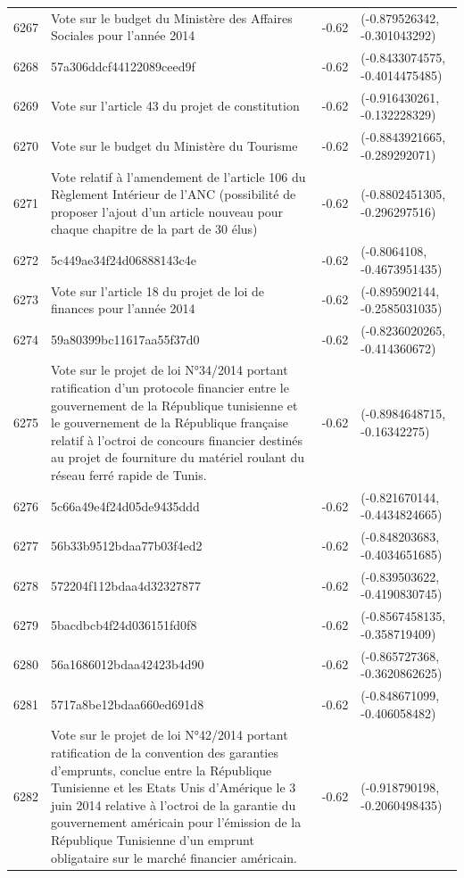 \begin{table}[ht]
\begin{tabular}{rlrl}
  6267 & Vote sur le budget du Ministère des Affaires Sociales pour l'année 2014 & -0.62 & (-0.879526342, -0.301043292) \\ 
  6268 & 57a306ddcf44122089ceed9f & -0.62 & (-0.8433074575, -0.4014475485) \\ 
  6269 & Vote sur l'article 43 du projet de constitution & -0.62 & (-0.916430261, -0.132228329) \\ 
  6270 & Vote sur le budget du Ministère du Tourisme & -0.62 & (-0.8843921665, -0.289292071) \\ 
  6271 & Vote relatif à l'amendement de l'article 106 du Règlement Intérieur de l'ANC (possibilité de proposer l'ajout d'un article nouveau pour chaque chapitre de la part de 30 élus) & -0.62 & (-0.8802451305, -0.296297516) \\ 
  6272 & 5c449ae34f24d06888143c4e & -0.62 & (-0.8064108, -0.4673951435) \\ 
  6273 & Vote sur l'article 18 du projet de loi de finances pour l'année 2014 & -0.62 & (-0.895902144, -0.2585031035) \\ 
  6274 & 59a80399bc11617aa55f37d0 & -0.62 & (-0.8236020265, -0.414360672) \\ 
  6275 & Vote sur le projet de loi N°34/2014 portant ratification d'un protocole financier entre le gouvernement de la République tunisienne et le gouvernement de la République française relatif à l'octroi de concours financier destinés au projet de fourniture du matériel roulant du réseau ferré rapide de Tunis. & -0.62 & (-0.8984648715, -0.16342275) \\ 
  6276 & 5c66a49e4f24d05de9435ddd & -0.62 & (-0.821670144, -0.4434824665) \\ 
  6277 & 56b33b9512bdaa77b03f4ed2 & -0.62 & (-0.848203683, -0.4034651685) \\ 
  6278 & 572204f112bdaa4d32327877 & -0.62 & (-0.839503622, -0.4190830745) \\ 
  6279 & 5bacdbcb4f24d036151fd0f8 & -0.62 & (-0.8567458135, -0.358719409) \\ 
  6280 & 56a1686012bdaa42423b4d90 & -0.62 & (-0.865727368, -0.3620862625) \\ 
  6281 & 5717a8be12bdaa660ed691d8 & -0.62 & (-0.848671099, -0.406058482) \\ 
  6282 & Vote sur le projet de loi N°42/2014 portant ratification de la convention des garanties d’emprunts, conclue entre la République Tunisienne et les Etats Unis d’Amérique le 3 juin 2014 relative à l’octroi de la garantie du gouvernement américain pour l’émission de la République Tunisienne d’un emprunt obligataire sur le marché financier américain. & -0.62 & (-0.918790198, -0.2060498435) \\ 

\end{tabular}
\end{table}
